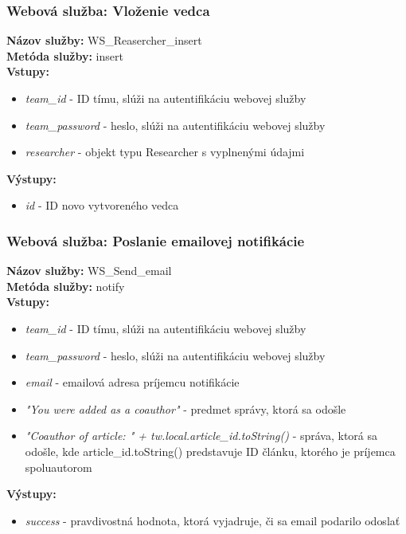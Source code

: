 \documentclass[10pt,oneside,slovak,a4paper]{article}
\begin{document}
\subsubsection{Webová služba: Vloženie vedca}
\textbf{Názov služby:} WS\_Reasercher\_insert\\
\textbf{Metóda služby:} insert\\
\textbf{Vstupy:}
	\begin{itemize}
		\item \textit{team\_id} - ID tímu, slúži na autentifikáciu webovej služby
		\item \textit{team\_password} - heslo, slúži na autentifikáciu webovej služby
		\item \textit{researcher} - objekt typu Researcher s vyplnenými údajmi
	\end{itemize}
\textbf{Výstupy:}
	\begin{itemize}
		\item \textit{id} - ID novo vytvoreného vedca
	\end{itemize}
	
\subsubsection{Webová služba: Poslanie emailovej notifikácie}
\textbf{Názov služby:} WS\_Send\_email\\
\textbf{Metóda služby:} notify\\
\textbf{Vstupy:}
	\begin{itemize}
		\item \textit{team\_id} - ID tímu, slúži na autentifikáciu webovej služby
		\item \textit{team\_password} - heslo, slúži na autentifikáciu webovej služby
		\item \textit{email} - emailová adresa príjemcu notifikácie
		\item \textit{"You were added as a coauthor"} - predmet správy, ktorá sa odošle
		\item \textit{"Coauthor of article: " + tw.local.article\_id.toString()} - správa, ktorá sa odošle, kde article\_id.toString() predstavuje ID článku, ktorého je príjemca spoluautorom
	\end{itemize}
\textbf{Výstupy:}
	\begin{itemize}
		\item \textit{success} - pravdivostná hodnota, ktorá vyjadruje, či sa email podarilo odoslať
	\end{itemize}
\end{document}
